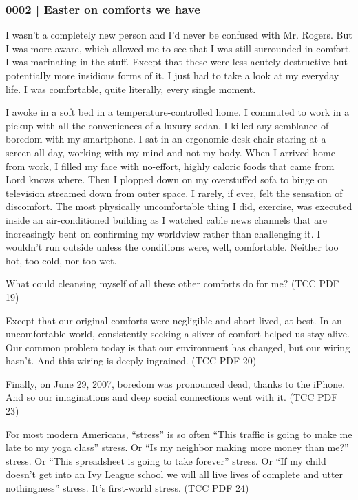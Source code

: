		\subsubsection{0002 | Easter on comforts we have}
			\label{GM-LIFE-GROWTH-0002}
			
			I wasn't a completely new person and I'd never be confused with Mr. Rogers. But I was more aware, which allowed me to see that I was still surrounded in comfort. I was marinating in the stuff. Except that these were less acutely destructive but potentially more insidious forms of it. I just had to take a look at my everyday life. I was comfortable, quite literally, every single moment. 

			I awoke in a soft bed in a temperature-controlled home. I commuted to work in a pickup with all the conveniences of a luxury sedan. I killed any semblance of boredom with my smartphone. I sat in an ergonomic desk chair staring at a screen all day, working with my mind and not my body. When I arrived home from work, I filled my face with no-effort, highly caloric foods that came from Lord knows where. Then I plopped down on my overstuffed sofa to binge on television streamed down from outer space. I rarely, if ever, felt the sensation of discomfort. The most physically uncomfortable thing I did, exercise, was executed inside an air-conditioned building as I watched cable news channels that are increasingly bent on confirming my worldview rather than challenging it. I wouldn't run outside unless the conditions were, well, comfortable. Neither too hot, too cold, nor too wet. 

			What could cleansing myself of all these other comforts do for me? (TCC PDF 19)
			
			Except that our original comforts were negligible and short-lived, at best. In an uncomfortable world, consistently seeking a sliver of comfort helped us stay alive. Our common problem today is that our environment has changed, but our wiring hasn't. And this wiring is deeply ingrained. (TCC PDF 20)
			
			Finally, on June 29, 2007, boredom was pronounced dead, thanks to the iPhone. And so our imaginations and deep social connections went with it. (TCC PDF 23)
			
			For most modern Americans, ``stress'' is so often ``This traffic is going to make me late to my yoga class'' stress. Or ``Is my neighbor making more money than me?'' stress. Or ``This spreadsheet is going to take forever'' stress. Or ``If my child doesn't get into an Ivy League school we will all live lives of complete and utter nothingness'' stress. It's first-world stress. (TCC PDF 24)
			
